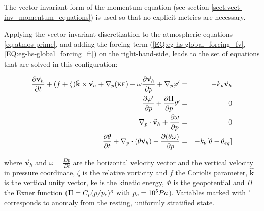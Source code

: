 The vector-invariant form of the momentum equation (see section
\ref{sect:vect-inv_momentum_equations}) is used so that no explicit 
metrics are necessary.

Applying the vector-invariant discretization to the
atmospheric equations \ref{eq:atmos-prime}, and adding the 
forcing term 
(\ref{EQ:eg-hs-global_forcing_fv}, \ref{EQ:eg-hs-global_forcing_ft})
on the right-hand-side,
leads to the set of equations that are solved in this configuration:


\begin{eqnarray}
\label{EQ:eg-hs-model_equations}
\frac{\partial \vec{\mathbf{v}}_h}{\partial t}
+(f + \zeta)\hat{\mathbf{k}} \times \vec{\mathbf{v}}_h
+\mathbf{\nabla }_{p} (\mbox{\sc ke})
+ \omega \frac{\partial \vec{\mathbf{v}}_h }{\partial p}
+\mathbf{\nabla }_p \varphi ^{\prime } 
&=& 
-k_\mathbf{v}\vec{\mathbf{v}}_h
\\
\frac{\partial \varphi ^{\prime }}{\partial p} 
+\frac{\partial \Pi }{\partial p}\theta ^{\prime } &=&0
\\
\mathbf{\nabla }_{p}\cdot \vec{\mathbf{v}}_h+\frac{\partial \omega }{
\partial p} &=&0
\\
\frac{\partial \theta }{\partial t} 
+ \mathbf{\nabla }_{p}\cdot (\theta \vec{\mathbf{v}}_h)
+ \frac{\partial (\theta \omega)}{\partial p}
&=& -k_{\theta}[\theta-\theta_{eq}]
\end{eqnarray}


\noindent where $\vec{\mathbf{v}}_h$ and $\omega = \frac{Dp}{Dt}$ 
are the horizontal velocity vector and the vertical velocity in pressure coordinate,
$\zeta$ is the relative vorticity and $f$ the Coriolis parameter, 
$\hat{\mathbf{k}}$ is the vertical unity vector, 
{\sc ke} is the kinetic energy, $\Phi$ is the geopotential
and $\Pi$ the Exner function 
($\Pi = C_p (p/p_c)^\kappa ~{\rm with}~ p_c = 10^5 Pa$).
Variables marked with ' corresponds to anomaly from 
the resting, uniformly stratified state.

